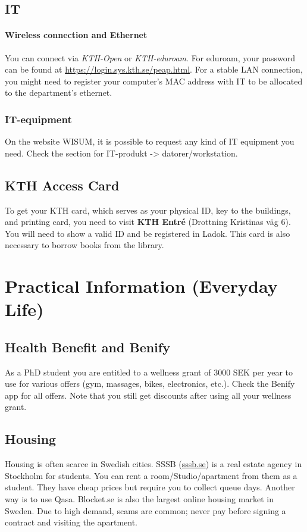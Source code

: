 \documentclass{article}
\begin{document}
\subsection{IT}
\paragraph{Wireless connection and Ethernet} You can connect via \textit{KTH-Open} or \textit{KTH-eduroam}. For eduroam, your password can be found at \url{https://login.sys.kth.se/peap.html}. For a stable LAN connection, you might need to register your computer's MAC address with IT to be allocated to the department's ethernet.

\subsubsection{IT-equipment}
On the website WISUM, it is possible to request any kind of IT equipment you need. Check the section for IT-produkt -> datorer/workstation.

\subsection{KTH Access Card}
To get your KTH card, which serves as your physical ID, key to the buildings, and printing card, you need to visit \textbf{KTH Entré} (Drottning Kristinas väg 6). You will need to show a valid ID and be registered in Ladok. This card is also necessary to borrow books from the library.

\section{Practical Information (Everyday Life)}

\subsection{Health Benefit and Benify}
As a PhD student you are entitled to a wellness grant of 3000 SEK per year to use for various offers (gym, massages, bikes, electronics, etc.). Check the Benify app for all offers. Note that you still get discounts after using all your wellness grant.

\subsection{Housing}
Housing is often scarce in Swedish cities. SSSB (\url{sssb.se}) is a real estate agency in Stockholm for students. You can rent a room/Studio/apartment from them as a student. They have cheap prices but require you to collect queue days. Another way is to use Qasa. Blocket.se is also the largest online housing market in Sweden. Due to high demand, scams are common; never pay before signing a contract and visiting the apartment.
\end{document}
